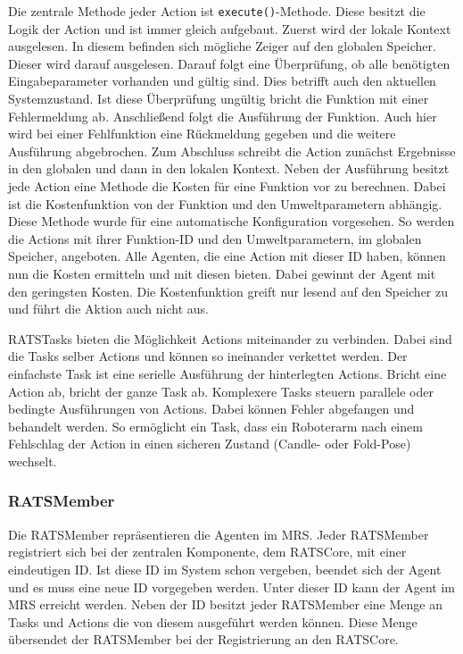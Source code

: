 Die zentrale Methode jeder Action ist  \lstinline|execute()|-Methode. Diese besitzt die Logik der Action und ist immer gleich aufgebaut. Zuerst wird der lokale Kontext ausgelesen. In diesem befinden sich mögliche Zeiger auf den globalen Speicher. Dieser wird darauf ausgelesen. Darauf folgt eine Überprüfung, ob alle benötigten Eingabeparameter vorhanden und gültig sind. Dies betrifft auch den aktuellen Systemzustand. Ist diese Überprüfung ungültig bricht die Funktion mit einer Fehlermeldung ab. Anschließend folgt die Ausführung der Funktion. Auch hier wird bei einer Fehlfunktion eine Rückmeldung gegeben und die weitere Ausführung abgebrochen. Zum Abschluss schreibt die Action zunächst Ergebnisse in den globalen und dann in den lokalen Kontext. Neben der Ausführung besitzt jede Action eine Methode die Kosten für eine Funktion vor zu berechnen. Dabei ist die Kostenfunktion von der Funktion und den Umweltparametern abhängig. Diese Methode wurde für eine automatische Konfiguration vorgesehen. So werden die Actions mit ihrer Funktion-ID und den Umweltparametern, im globalen Speicher, angeboten. Alle Agenten, die eine Action mit dieser ID haben, können nun die Kosten ermitteln und mit diesen bieten. Dabei gewinnt der Agent mit den geringsten Kosten. Die Kostenfunktion greift nur lesend auf den Speicher zu und führt die Aktion auch nicht aus.

RATSTasks bieten die Möglichkeit Actions miteinander zu verbinden. Dabei sind die Tasks selber Actions und können so ineinander verkettet werden. Der einfachste Task ist eine serielle Ausführung der hinterlegten Actions. Bricht eine Action ab, bricht der ganze Task ab. Komplexere Tasks steuern parallele oder bedingte Ausführungen von Actions. Dabei können Fehler abgefangen und behandelt werden. So ermöglicht ein Task, dass ein Roboterarm nach einem Fehlschlag der Action in einen sicheren Zustand (Candle- oder Fold-Pose) wechselt.


\subsubsection{RATSMember}
\label{sec:devmember}
Die RATSMember repräsentieren die Agenten im MRS. Jeder RATSMember registriert sich bei der zentralen Komponente, dem RATSCore, mit einer eindeutigen ID. Ist diese ID im System schon vergeben, beendet sich der Agent und es muss eine neue ID vorgegeben werden. Unter dieser ID kann der Agent im MRS erreicht werden. Neben der ID besitzt jeder RATSMember eine Menge an Tasks und Actions die von diesem ausgeführt werden können. Diese Menge übersendet der RATSMember bei der Registrierung an den RATSCore. 

